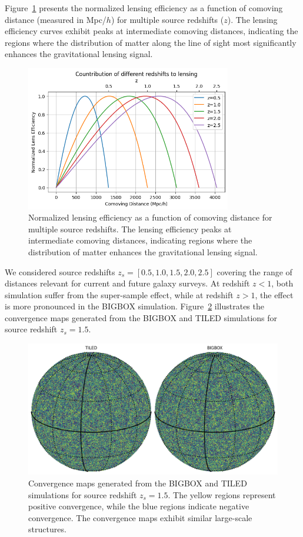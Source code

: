 Figure~\ref{fig:lensing_efficiency} presents the normalized lensing efficiency as a function of comoving distance (measured in Mpc/$h$) for multiple source redshifts ($z$). The lensing efficiency curves exhibit peaks at intermediate comoving distances, indicating the regions where the distribution of matter along the line of sight most significantly enhances the gravitational lensing signal. 

\begin{figure}
    \centering
    \includegraphics[width=0.8\textwidth]{figures/lensefficiency.png}
    \caption{Normalized lensing efficiency as a function of comoving distance for multiple source redshifts. The lensing efficiency peaks at intermediate comoving distances, indicating regions where the distribution of matter enhances the gravitational lensing signal.} \label{fig:lensing_efficiency}
\end{figure}

We considered source redshifts $z_s = [0.5, 1.0, 1.5, 2.0, 2.5]$ covering the range of distances relevant for current and future galaxy surveys. At redshift $z < 1$, both simulation suffer from the super-sample effect, while at redshift $z > 1$, the effect is more pronounced in the BIGBOX simulation. Figure~\ref{fig:convergence_maps} illustrates the convergence maps generated from the BIGBOX and TILED simulations for source redshift $z_s = 1.5$. 

\begin{figure}
    \centering
    \includegraphics[width=\textwidth]{figures/samplemap.png}
    \caption{Convergence maps generated from the BIGBOX and TILED simulations for source redshift $z_s = 1.5$. The yellow regions represent positive convergence, while the blue regions indicate negative convergence. The convergence maps exhibit similar large-scale structures.} \label{fig:convergence_maps}
\end{figure}


